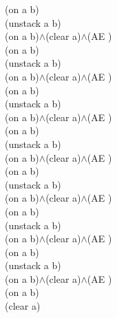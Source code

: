 {{(on a b)\\
(unstack a b)\\
(on a b)$\wedge$(clear a)$\wedge$(AE )\\
(on a b)\\
(unstack a b)\\
(on a b)$\wedge$(clear a)$\wedge$(AE )\\
(on a b)\\
(unstack a b)\\
(on a b)$\wedge$(clear a)$\wedge$(AE )\\
(on a b)\\
(unstack a b)\\
(on a b)$\wedge$(clear a)$\wedge$(AE )\\
(on a b)\\
(unstack a b)\\
(on a b)$\wedge$(clear a)$\wedge$(AE )\\
(on a b)\\
(unstack a b)\\
(on a b)$\wedge$(clear a)$\wedge$(AE )\\
(on a b)\\
(unstack a b)\\
(on a b)$\wedge$(clear a)$\wedge$(AE )\\
(on a b)\\
(clear a)\\
}%
}

